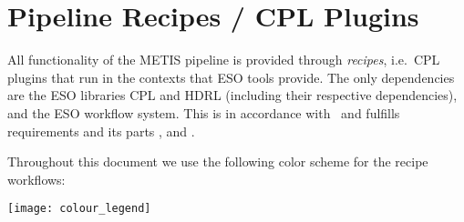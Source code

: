 \clearpage

\section{Pipeline Recipes / CPL Plugins}
\label{sec:pipeline_recipes}

All functionality of the METIS pipeline is provided through \emph{recipes}, i.e.~CPL plugins that run in the contexts that ESO tools provide. The only dependencies are the ESO libraries CPL and HDRL (including their respective dependencies), and the ESO workflow system. This is in accordance with~\cite{1618} and fulfills requirements  and its parts ,  and .

Throughout this document we use the following color scheme for the
recipe workflows:
\begin{center}
  \texttt{[image: colour\_legend]}
\end{center}










